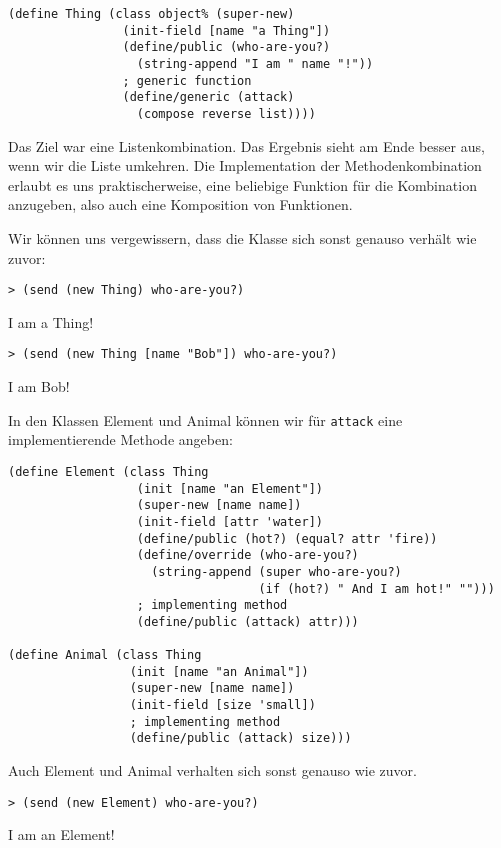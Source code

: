 \begin{lstlisting}
(define Thing (class object% (super-new)
                (init-field [name "a Thing"])
                (define/public (who-are-you?)
                  (string-append "I am " name "!"))
                ; generic function
                (define/generic (attack)
                  (compose reverse list))))
\end{lstlisting}

Das Ziel war eine Listenkombination. Das Ergebnis sieht am Ende besser aus, wenn wir die Liste umkehren. Die Implementation der Methodenkombination erlaubt es uns praktischerweise, eine beliebige Funktion für die Kombination anzugeben, also auch eine Komposition von Funktionen.

Wir können uns vergewissern, dass die Klasse sich sonst genauso verhält wie zuvor:

\begin{lstlisting}
> (send (new Thing) who-are-you?)
\end{lstlisting}
{\routput {\qq}I am a Thing!\qq}

\begin{lstlisting}
> (send (new Thing [name "Bob"]) who-are-you?)
\end{lstlisting}
{\routput {\qq}I am Bob!\qq}

In den Klassen Element und Animal können wir für \texttt{attack} eine implementierende Methode angeben:

\begin{lstlisting}
(define Element (class Thing 
                  (init [name "an Element"])
                  (super-new [name name])
                  (init-field [attr 'water])
                  (define/public (hot?) (equal? attr 'fire))
                  (define/override (who-are-you?)
                    (string-append (super who-are-you?)
                                   (if (hot?) " And I am hot!" "")))
                  ; implementing method
                  (define/public (attack) attr)))
                  
(define Animal (class Thing
                 (init [name "an Animal"])
                 (super-new [name name])
                 (init-field [size 'small])
                 ; implementing method
                 (define/public (attack) size)))
\end{lstlisting}

Auch Element und Animal verhalten sich sonst genauso wie zuvor.

\begin{lstlisting}
> (send (new Element) who-are-you?)
\end{lstlisting}
{\routput {\qq}I am an Element!\qq}


